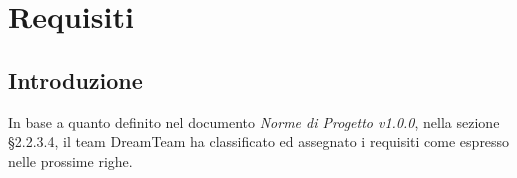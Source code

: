 \section{Requisiti}

\subsection{Introduzione}
In base a quanto definito nel documento \textit{Norme di Progetto v1.0.0}, nella sezione §2.2.3.4, il team DreamTeam ha classificato ed assegnato i requisiti come espresso nelle prossime righe.

